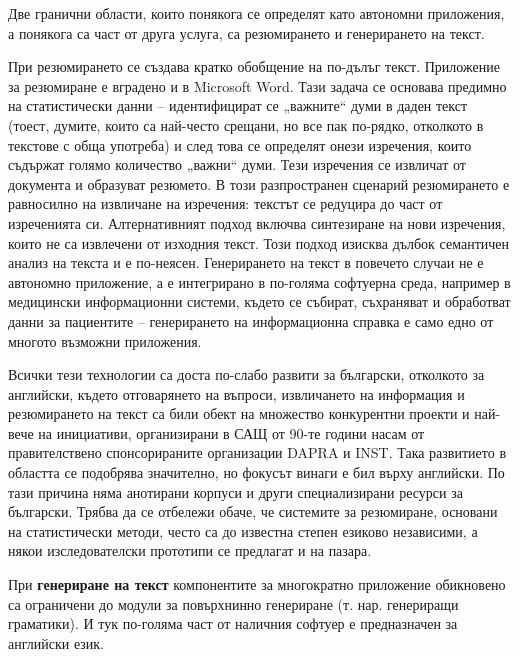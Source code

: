 \begin{multicols}{2}
  Две гранични области, които понякога се определят като автономни приложения, а понякога са част от друга услуга, са резюмирането и генерирането на текст. 


  При резюмирането се създава кратко обобщение на по-дълъг текст. Приложение за резюмиране е вградено и в Microsoft Word. Тази задача се основава предимно на статистически данни -- идентифицират се „важните“ думи в даден текст (тоест, думите, които са най-често срещани, но все
   пак по-рядко, отколкото в текстове с обща употреба) и
   след това се определят онези изречения, които съдържат
   голямо количество „важни“ думи. Тези изречения се извличат от документа и образуват резюмето. В този разпространен сценарий резюмирането е равносилно на извличане на изречения: текстът се редуцира до част от изреченията си.
   Алтернативният подход включва синтезиране на нови
   изречения, които не са извлечени от изходния текст. Този подход изисква дълбок семантичен анализ на текста и е по-неясен. Генерирането на текст в повечето случаи не е автономно приложение, а е интегрирано в по-голяма софтуерна среда, например в медицински информационни системи, където се събират, съхраняват и обработват данни за пациентите -- генерирането на информационна справка е само едно от многото възможни приложения.


  Всички тези технологии са доста по-слабо развити за български, отколкото за английски, където отговарянето на въпроси, извличането на информация
   и резюмирането на текст са били обект на множество конкурентни проекти и най-вече на инициативи, организирани в САЩ от 90-те години насам от правителствено спонсорираните организации DAPRA и INST. Така развитието в областта се подобрява значително, но фокусът винаги е бил върху английски. По тази причина няма анотирани корпуси и други специализирани ресурси за български. Трябва да се отбележи обаче, че системите за резюмиране, основани на статистически методи, често са до известна степен езиково независими, а някои изследователски прототипи се предлагат и на пазара.

  При \textbf{генериране на текст} компонентите за многократно приложение обикновено са
   ограничени до модули за повърхнинно генериране (т. нар. генериращи граматики). И тук по-голяма част от наличния софтуер е предназначен за английски език.


\end{multicols}
